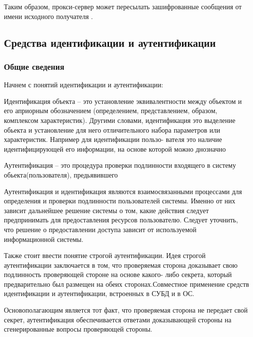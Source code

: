Таким образом, прокси-сервер может пересылать зашифрованные сообщения от имени исходного получателя \cite{zkd}.


\subsection{Средства идентификации и аутентификации}
\subsubsection{Общие сведения}
Начнем с понятий идентификации и аутентификации:

Идентификация объекта – это установление эквивалентности между объектом и его априорным
обозначением (определением, представлением, образом, комплексом характеристик). Другими словами,
идентификация это выделение обьекта и установление для него отличительного набора параметров или
характеристик. Например для идентификации пользо- вателя это наличие идентифицирующей его
информации, на основе которой можно днозначно

Аутентификация – это процедура проверки подлинности входящего в систему обьекта(пользователя),
предьявившего

Аутентификация и идентификация являются взаимосвязанными процессами для определения и проверки
подлинности пользователей системы. Именно от них зависит дальнейшее решение системы о том, какие
действия следует предпринимать для предоставления ресурсов пользователю. Следует уточнить, что
решение о предоставлении доступа зависит от используемой информационной системы.

Также стоит ввести понятие строгой аутентификации. Идея строгой аутентификации заключается в том,
что проверяемая сторона доказывает свою подлинность проверяющей стороне на основе какого- либо
секрета, который предварительно был размещен на обеих сторонах.Совместное применение средств
идентификации и аутентификации, встроенных в СУБД и в ОС.

Основополагающим является тот факт, что проверяемая сторона не передает свой секрет, аутентификация
обеспечивается ответами доказывающей стороны на сгенерированные вопросы проверяющей стороны.

